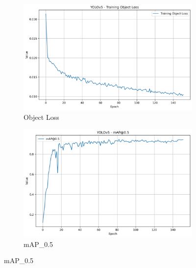 \documentclass{article}
\begin{document}
\begin{figure}[h!]
  \centering
  \begin{subfigure}[b]{0.495\textwidth}
    \includegraphics[width=\linewidth]{Training Object Loss.png}
    \caption{Object Loss}
  \end{subfigure}
  \begin{subfigure}[b]{0.495\textwidth}
    \includegraphics[width=\linewidth]{mAP_0.5.png}
    \caption{mAP\_0.5}
  \end{subfigure}
\end{figure}
\end{document}
